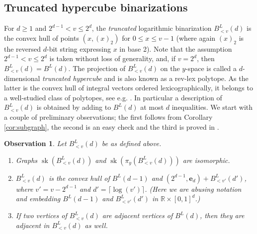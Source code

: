 \documentclass[11pt,a4paper]{article}
\newtheorem{observation}[theorem]{Observation}
\newcommand{\R}{\mathbb{R}}
\newcommand{\1}{\textbf{1}}
\newcommand{\rk}{\operatorname{rk}}
\newcommand{\sk}{\operatorname{sk}}
\newcommand\manuel[1]{\textcolor{LimeGreen}{\textbf{ MA:  #1}}}
\newcommand\marco[1]{\textcolor{red}{\textbf{ MDS:  #1}}}
\begin{document}








\subsection{Truncated hypercube binarizations}\label{sec:trunc}


For $d\geq 1$ and $2^{d-1}< v\leq 2^d$, the \emph{truncated} logarithmic binarization $B^L_{< v}(d)$ is the convex hull of points $(x,(x)_2)$ for $0\leq x\leq v-1$ (where again $(x)_2$ is the reversed $d$-bit string expressing $x$ in base 2). Note that the assumption $2^{d-1}< v\leq 2^d$ is taken without loss of generality, and, if $v=2^d$, then $B^L_{< v}(d)=B^L(d)$. The projection of $B^L_{< v}(d)$ on the $y$-space is called a $d$-dimensional {\em truncated hypercube} and is also known as a rev-lex polytope.  As the latter is the convex hull of integral vectors ordered lexicographically, it belongs to a well-studied class of polytopes, see e.g. \cite{gillmann2006revlex, gupte2016convex,conforti2020scanning}. In particular a description of $B^L_{< v}(d)$ is obtained by adding to $B^L(d)$ at most $d$ inequalities.  
We start with a couple of preliminary observations; the first follows from Corollary \ref{cor:subgraph}, the second is an easy check and the third is proved in \cite{gillmann2006revlex}.

\begin{observation}\label{obs:trunc}
Let $B^L_{< v}(d)$ be as defined above.
\begin{enumerate}
    \item Graphs $\sk(B^L_{< v}(d))$ and $\sk(\pi_y(B^L_{< v}(d)))$ are isomorphic.
    \item %
    $B^L_{< v}(d)$ is the convex hull of $B^L(d-1)$ and $(2^{d-1},\mathbf e_d)+B^L_{< v'}(d')$, where $v'=v-2^{d-1}$ and $d'=\lceil{\log(v')}\rceil$. (Here we are abusing notation and embedding $B^L(d-1)$ and $B^L_{< v'}(d')$ in $\R\times[0,1]^d$.)
    \item If two vertices of $B^L_{< v}(d)$ are adjacent vertices of $B^L(d)$, then they are adjacent in $B^L_{< v}(d)$ as well.
\end{enumerate}
\end{observation}
 
\end{document}
